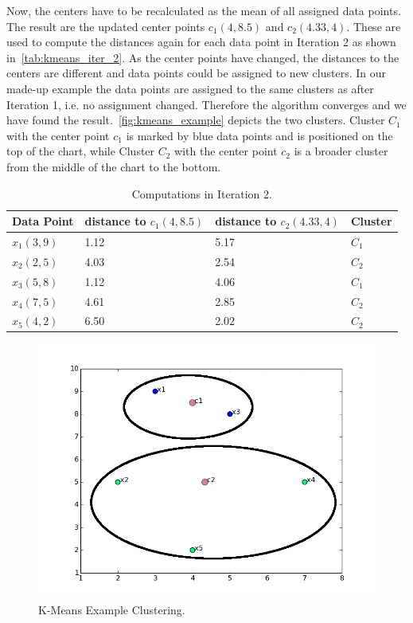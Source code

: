 Now, the centers have to be recalculated as the mean of all assigned data points. The result are the updated center points $c_1(4,8.5)$ and $c_2(4.33,4)$. These are used to compute the distances again for each data point in Iteration 2 as shown in~\autoref{tab:kmeans_iter_2}. As the center points have changed, the distances to the centers are different and data points could be assigned to new clusters. In our made-up example the data points are assigned to the same clusters as after Iteration 1, i.e. no assignment changed. Therefore the algorithm converges and we have found the result.~\autoref{fig:kmeans_example} depicts the two clusters. Cluster $C_1$ with the center point $c_1$ is marked by blue data points and is positioned on the top of the chart, while Cluster $C_2$ with the center point $c_2$ is a broader cluster from the middle of the chart to the bottom.

\begin{table}[htsb]
  \caption[Computations in Iteration 2]{Computations in Iteration 2.}\label{tab:kmeans_iter_2}
  \centering
  \begin{tabular}{l l l l}
    \toprule
      Data Point & distance to $c_1(4,8.5)$ & distance to $c_2(4.33,4)$ & Cluster \\
    \midrule
        $x_1(3,9)$ & 1.12 & 5.17 & $C_1$ \\
        $x_2(2,5)$ & 4.03 & 2.54 & $C_2$ \\
        $x_3(5,8)$ & 1.12 & 4.06 & $C_1$ \\
        $x_4(7,5)$ & 4.61 & 2.85 & $C_2$ \\
        $x_5(4,2)$ & 6.50 & 2.02 & $C_2$ \\
    \bottomrule
  \end{tabular}
\end{table}


\begin{figure}[htsb]
  \centering
  \includegraphics[scale=0.5, trim="0cm 1cm 0cm 0cm"]{figures/kmeans_example2}
  \caption[K-Means Example Clustering]{K-Means Example Clustering.}\label{fig:kmeans_example}
\end{figure}

